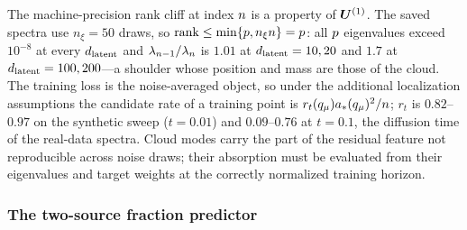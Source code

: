 \begin{remark}\label{rem:single-vs-averaged-pred}
The machine-precision rank cliff at index $n$ is a property of $\bm{U}^{(1)}$. The saved spectra use $n_\xi=50$ draws, so $\mathrm{rank}\le\min\{p,n_\xi n\}=p$: all $p$ eigenvalues exceed $10^{-8}$ at every $d_{\mathrm{latent}}$ and $\lambda_{n-1}/\lambda_{n}$ is $1.01$ at $d_{\mathrm{latent}}=10,20$ and $1.7$ at $d_{\mathrm{latent}}=100,200$---a shoulder whose position and mass are those of the cloud. The training loss is the noise-averaged object, so under the additional localization assumptions the candidate rate of a training point is $r_t(q_\mu)a_*(q_\mu)^2/n$; $r_t$ is $0.82$--$0.97$ on the synthetic sweep ($t=0.01$) and $0.09$--$0.76$ at $t=0.1$, the diffusion time of the real-data spectra. Cloud modes carry the part of the residual feature not reproducible across noise draws; their absorption must be evaluated from their eigenvalues and target weights at the correctly normalized training horizon.
\end{remark}

\subsubsection{The two-source fraction predictor}

